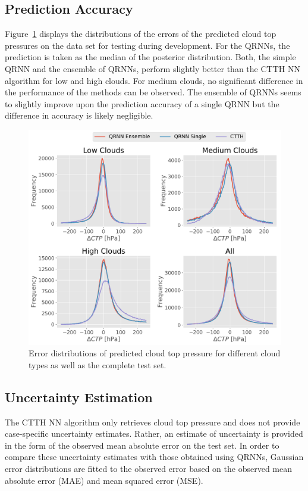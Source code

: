 \documentclass[journal abbreviation, manuscript]{copernicus}
\begin{document}
\subsection{Prediction Accuracy}


  Figure~\ref{fig:ctp_results} displays the distributions of the errors of the
  predicted cloud top pressures on the data set for testing during development.
  For the QRNNs, the prediction is taken as the median of the posterior
  distribution. Both, the simple QRNN and the ensemble of QRNNs, perform
  slightly better than the CTTH NN algorithm for low and high clouds. For medium
  clouds, no significant difference in the performance of the methods can be
  observed. The ensemble of QRNNs seems to slightly improve upon the prediction
  accuracy of a single QRNN but the difference in accuracy is likely negligible.

  \begin{figure}[hbpt!]
    \centering
    \includegraphics[width = 0.8\linewidth]{../plots/ctp_results}
    \caption{Error distributions of predicted cloud top pressure for different cloud types as well as
    the complete test set.}
    \label{fig:ctp_results}
  \end{figure}

\subsection{Uncertainty Estimation}

The CTTH NN algorithm only retrieves cloud top pressure and does not provide
case-specific uncertainty estimates. Rather, an estimate of uncertainty is
provided in the form of the observed mean absolute error on the test set. In
order to compare these uncertainty estimates with those obtained using QRNNs,
Gaussian error distributions are fitted to the observed error based on the
observed mean absolute error (MAE) and mean squared error (MSE).
\end{document}
